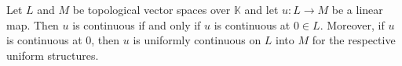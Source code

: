 Let $L$ and $M$ be topological vector spaces over $\mathbb{K}$ and let $u: L \to M$ be a linear map. Then $u$ is continuous if and only if $u$ is continuous at $0 \in L$. Moreover, if $u$ is continuous at $0$, then $u$ is uniformly continuous on $L$ into $M$ for the respective uniform structures.
